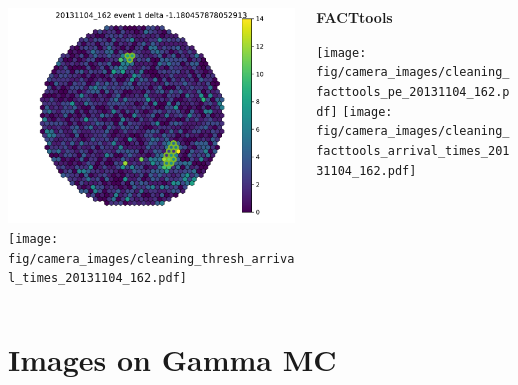\begin{withoutheadline}
\begin{frame}{}
\begin{columns}[onlytextwidth]
\begin{column}{0.33\textwidth}
        \includegraphics[width=\textwidth, page=79]{fig/camera_images/cleaning_thresh_pe_20131104_162.pdf}
        \texttt{[image: fig/camera\_images/cleaning\_thresh\_arrival\_times\_20131104\_162.pdf]}
      \end{column}
    \hfill%
      \begin{column}{0.33\textwidth}
          \centering
        \textbf{FACTtools}\par\medskip
        \texttt{[image: fig/camera\_images/cleaning\_facttools\_pe\_20131104\_162.pdf]}
        \texttt{[image: fig/camera\_images/cleaning\_facttools\_arrival\_times\_20131104\_162.pdf]}
      \end{column}
    \end{columns}
  \end{frame}
\end{withoutheadline}

\section{Images on Gamma MC}

